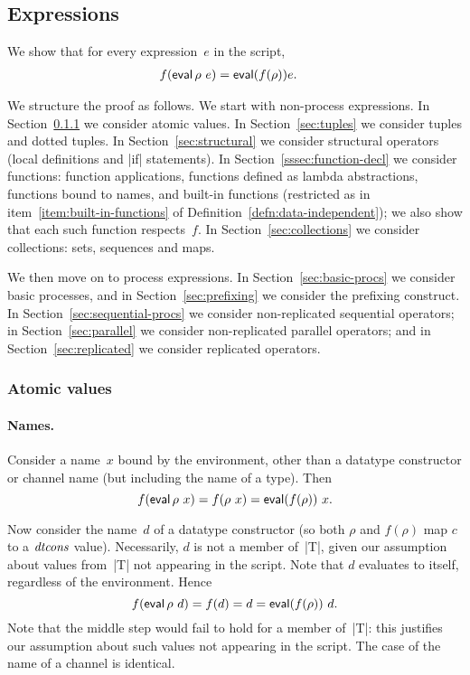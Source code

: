 \subsection{Expressions}

We show that for every expression~$e$ in the script,
\begin{eqnarray*}
f(\mathop{\sf eval} \rho ~ e) & = \mathop{\sf eval} (f(\rho)) e .
\end{eqnarray*}

We structure the proof as follows.  We start with non-process expressions.  In
Section~\ref{sec:atomic} we consider atomic values.  In
Section~\ref{sec:tuples} we consider tuples and dotted tuples.  In
Section~\ref{sec:structural} we consider structural operators (local
definitions and |if| statements).  In Section~\ref{sssec:function-decl} we
consider functions: function applications, functions defined as lambda
abstractions, functions bound to names, and built-in functions (restricted as
in item~\ref{item:built-in-functions} of
Definition~\ref{defn:data-independent}); we also show that each such function
respects~$f$.  In Section~\ref{sec:collections} we consider collections: sets,
sequences and maps.

We then move on to process expressions.  In Section~\ref{sec:basic-procs} we
consider basic processes, and in Section~\ref{sec:prefixing} we consider the
prefixing construct.  In Section~\ref{sec:sequential-procs} we consider
non-replicated sequential operators; in Section~\ref{sec:parallel} we consider
non-replicated parallel operators; and in Section~\ref{sec:replicated} we
consider replicated operators.



\subsubsection{Atomic values}
\label{sec:atomic}

\paragraph{Names.}

Consider a name~$x$ bound by the environment, other than a datatype
constructor or channel name (but including the name of a type).  Then
\[
f(\mathop{\sf eval} \rho~x) = f(\rho~x) = \mathop{\sf eval} (f(\rho))~x.
\]

Now consider the name~$d$ of a datatype constructor (so both $\rho$ and
$f(\rho)$ map $c$ to a $\mathop{\it dtcons}$ value).  Necessarily, $d$ is not a member
of~|T|, given our assumption about values from~|T| not appearing in the
script.  Note that $d$ evaluates to itself, regardless of the environment.
Hence
\[
f(\mathop{\sf eval} \rho~d) = f(d) = d = \mathop{\sf eval} (f(\rho))~d.
\]
Note that the middle step would fail to hold for a member of~|T|: this
justifies our assumption about such values not appearing in the script. 
%
The case of the name of a channel is identical. 

